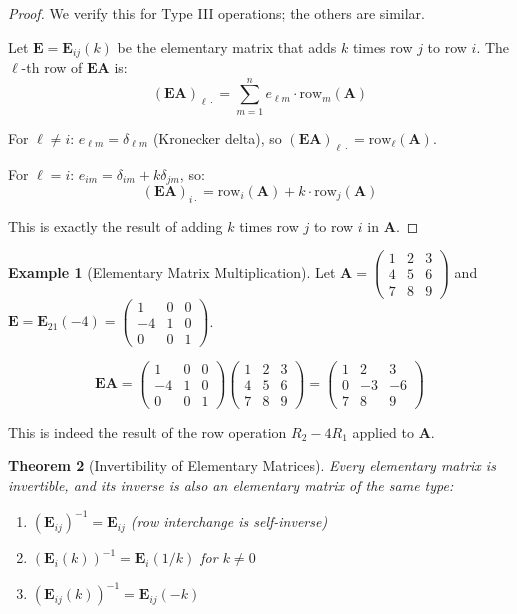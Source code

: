 \documentclass[12pt]{article}
\numberwithin{equation}{section}
\newcommand{\mat}[1]{\mathbf{#1}}        %
\theoremstyle{plain}
\newtheorem{theorem}{Theorem}[section]
\theoremstyle{definition}
\newtheorem{example}[theorem]{Example}
\theoremstyle{remark}
\begin{document}
\begin{proof}
We verify this for Type III operations; the others are similar.

Let $\mat{E} = \mat{E}_{ij}(k)$ be the elementary matrix that adds $k$ times row $j$ to row $i$. The $\ell$-th row of $\mat{E}\mat{A}$ is:
$$(\mat{E}\mat{A})_{\ell \cdot} = \sum_{m=1}^n e_{\ell m} \cdot \text{row}_m(\mat{A})$$

For $\ell \neq i$: $e_{\ell m} = \delta_{\ell m}$ (Kronecker delta), so $(\mat{E}\mat{A})_{\ell \cdot} = \text{row}_\ell(\mat{A})$.

For $\ell = i$: $e_{im} = \delta_{im} + k\delta_{jm}$, so:
$$(\mat{E}\mat{A})_{i \cdot} = \text{row}_i(\mat{A}) + k \cdot \text{row}_j(\mat{A})$$

This is exactly the result of adding $k$ times row $j$ to row $i$ in $\mat{A}$.
\end{proof}

\begin{example}[Elementary Matrix Multiplication]
Let $\mat{A} = \begin{pmatrix} 1 & 2 & 3 \\ 4 & 5 & 6 \\ 7 & 8 & 9 \end{pmatrix}$ and $\mat{E} = \mat{E}_{21}(-4) = \begin{pmatrix} 1 & 0 & 0 \\ -4 & 1 & 0 \\ 0 & 0 & 1 \end{pmatrix}$.

$$\mat{E}\mat{A} = \begin{pmatrix} 1 & 0 & 0 \\ -4 & 1 & 0 \\ 0 & 0 & 1 \end{pmatrix}\begin{pmatrix} 1 & 2 & 3 \\ 4 & 5 & 6 \\ 7 & 8 & 9 \end{pmatrix} = \begin{pmatrix} 1 & 2 & 3 \\ 0 & -3 & -6 \\ 7 & 8 & 9 \end{pmatrix}$$

This is indeed the result of the row operation $R_2 - 4R_1$ applied to $\mat{A}$.
\end{example}

\begin{theorem}[Invertibility of Elementary Matrices]
Every elementary matrix is invertible, and its inverse is also an elementary matrix of the same type:
\begin{enumerate}
\item $(\mat{E}_{ij})^{-1} = \mat{E}_{ij}$ (row interchange is self-inverse)
\item $(\mat{E}_i(k))^{-1} = \mat{E}_i(1/k)$ for $k \neq 0$
\item $(\mat{E}_{ij}(k))^{-1} = \mat{E}_{ij}(-k)$
\end{enumerate}
\end{theorem}
\end{document}
